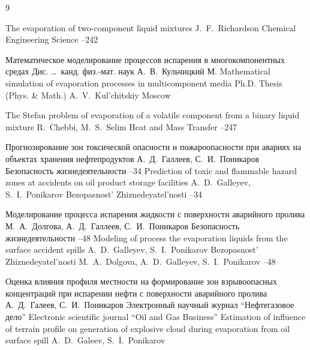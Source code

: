 \begin{thebibliography}{9}

\paper The evaporation of two-component liquid mixtures 
\by J.~F.~Richardson 
\jour Chemical Engineering Science 
--242

\thesis Математическое моделирование процессов испарения в многокомпонентных средах 
\thesisinfo Дис. \dots\ канд. физ.-мат. наук 
\by А.~В.~Кульчицкий
\publaddr М.
\misctransl
\thesis Mathematical simulation of evaporation processes in multicomponent media
\thesisinfo Ph.D. Thesis (Phys. \& Math.)
\by A.~V.~Kul'chitskiy
\publaddr Moscow

\paper The Stefan problem of evaporation of a volatile component from a binary liquid mixture
\by  R.~Chebbi, M.~S.~Selim 
\jour Heat and Mass Transfer 
--247


\paper Прогнозирование зон токсической опасности и пожароопасности при авариях на объектах хранения нефтепродуктов 
\by А.~Д.~Галлеев, С.~И.~Поникаров 
\jour Безопасность жизнедеятельности
--34
\misctransl
\paper Prediction of toxic and flammable hazard zones at accidents on oil product storage facilities
\by A.~D.~Galleyev, S.~I.~Ponikarov 
\jour Bezopasnost' Zhiznedeyatel'nosti 
--34


\paper Моделирование процесса испарения жидкости с поверхности аварийного пролива
\by М.~А.~Долгова, А.~Д.~Галлеев, С.~И.~Поникаров 
\jour Безопасность жизнедеятельности
--48
\misctransl
\paper Modeling of process the evaporation liquids from the surface accident spills
\by A.~D.~Galleyev, S.~I.~Ponikarov 
\jour Bezopasnost' Zhiznedeyatel'nosti 
\by M.~A.~Dolgova, A.~D.~Galleyev, S.~I.~Ponikarov
--48


\paper Оценка влияния профиля местности на формирование зон взрывоопасных концентраций при испарении нефти с поверхности аварийного пролива 
\by А.~Д.~Галеев, С.~И.~Поникаров 
\jour  Электронный научный журнал ``Нефтегазовое дело'' 
\misctransl
\jour Electronic scientific journal ``Oil and Gas Business''
\paper Estimation of influence of terrain profile on generation of explosive cloud during evaporation from oil surface spill
\by A.~D.~Galeev, S.~I.~Ponikarov 


\end{thebibliography}
